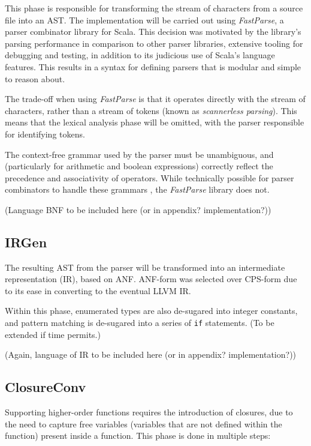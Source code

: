 This phase is responsible for transforming the stream of characters from a source file into an AST.
The implementation will be carried out using \emph{FastParse}, a parser combinator library for
Scala. This decision was motivated by the library's parsing performance in comparison to other
parser libraries, extensive tooling for debugging and testing, in addition to its judicious use of
Scala's language features. This results in a syntax for defining parsers that is modular and simple
to reason about.

The trade-off when using \emph{FastParse} is that it operates directly with the stream of characters,
rather than a stream of tokens (known as \emph{scannerless parsing}). This means that the lexical
analysis phase will be omitted, with the parser responsible for identifying tokens.

The context-free grammar used by the parser must be unambiguous, and
(particularly for arithmetic and boolean expressions) correctly reflect the precedence and
associativity of operators. While technically possible for parser combinators to handle
these grammars \autocite{frost2008recursiveparsers}, the \emph{FastParse} library does not.


(Language BNF to be included here (or in appendix? implementation?))

\subsection{IRGen}

The resulting AST from the parser will be transformed into an intermediate representation (IR),
based on ANF. ANF-form was selected over CPS-form due to its ease in converting to the eventual LLVM
IR.

Within this phase, enumerated types are also de-sugared into integer constants, and pattern matching
is de-sugared into a series of \texttt{if} statements. (To be extended if time permits.)

(Again, language of IR to be included here (or in appendix? implementation?))


\subsection{ClosureConv}

Supporting higher-order functions requires the introduction of closures, due to the need to capture
free variables (variables that are not defined within the function) present inside a function. This
phase is done in multiple steps:

